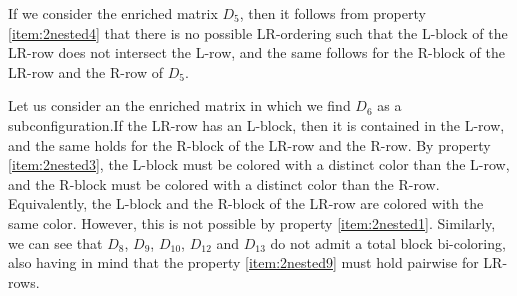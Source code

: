 \documentclass[12pt]{book}
\theoremstyle{plain}
\theoremstyle{remark}
\begin{document}
If we consider the enriched matrix $D_5$, then it follows from property \ref{item:2nested4} that there is no possible LR-ordering such that the L-block of the LR-row does not intersect the L-row, and the same follows for the R-block of the LR-row and the R-row of $D_5$.

Let us consider an the enriched matrix in which we find $D_6$ as a subconfiguration.If the LR-row has an L-block, then it is contained in the L-row, and the same holds for the R-block of the LR-row and the R-row. By property \ref{item:2nested3}, the L-block must be colored with a distinct color than the L-row, and the R-block must be colored with a distinct color than the R-row. Equivalently, the L-block and the R-block of the LR-row are colored with the same color. However, this is not possible by property \ref{item:2nested1}.
Similarly, we can see that $D_8$, $D_9$, $D_{10}$, $D_{12}$ and $D_{13}$ do not admit a total block bi-coloring, also having in mind that the property \ref{item:2nested9} must hold pairwise for LR-rows.

\vspace{1mm}
\end{document}
